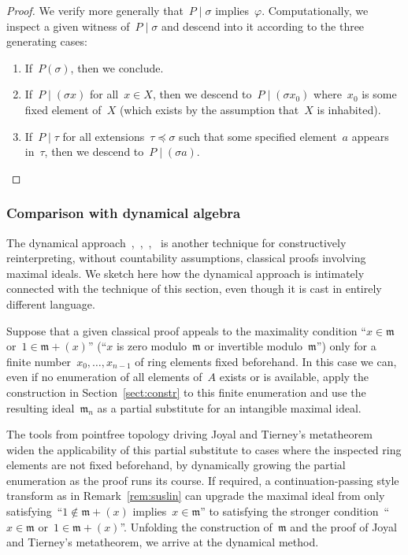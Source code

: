 \documentclass[com,11pt,crcready]{iosart2x}
\theoremstyle{definition}
\theoremstyle{plain}
\theoremstyle{remark}
\newcommand{\mmm}{\mathfrak{m}}
\renewcommand{\_}{\mathpunct{.}\,}
\begin{document}
\begin{proof}We verify more generally that~$P \mid \sigma$ implies~$\varphi$.
Computationally, we inspect a given witness of~$P \mid \sigma$ and descend into
it according to the three generating cases:
\begin{enumerate}
\item If~$P(\sigma)$, then we conclude.
\item
If~$P \mid (\sigma x)$ for all~$x \in X$, then we descend to~$P \mid
(\sigma x_0)$ where~$x_0$ is some fixed element of~$X$ (which exists by
the assumption that~$X$ is inhabited).
\item If~$P \mid \tau$ for all
extensions~$\tau \preceq \sigma$ such that some specified element~$a$ appears
in~$\tau$, then we descend to~$P \mid (\sigma a)$.
\end{enumerate}
\end{proof}


\subsubsection{Comparison with dynamical algebra}

The dynamical approach~\cite[Section~XV.6]{lombardi-quitte:constructive-algebra},~\cite{coquand-lombardi-roy:dynamicalmethod},~\cite{yengui:constructive},~\cite{duval:about}
is another technique for constructively reinterpreting,
without countability assumptions, classical proofs involving maximal ideals.
We sketch here how the dynamical approach is intimately connected with the
technique of this section, even though it is cast in entirely different
language.

Suppose that a given classical proof appeals to the maximality condition ``$x \in \mmm$
or~$1 \in \mmm + (x)$'' (``$x$ is zero modulo~$\mmm$ or invertible
modulo~$\mmm$'') only for a finite number~$x_0,\ldots,x_{n-1}$ of ring elements
fixed beforehand. In this case we can, even if no enumeration of all elements
of~$A$ exists or is available, apply the construction in Section~\ref{sect:constr} to
this finite enumeration and use the resulting ideal~$\mmm_n$ as a partial
substitute for an intangible maximal ideal.

The tools from pointfree topology
driving Joyal and Tierney's metatheorem widen the applicability of this partial
substitute to cases where the inspected ring elements are
not fixed beforehand, by dynamically growing the partial enumeration as the
proof runs its course. If required, a continuation-passing style transform as
in Remark~\ref{rem:suslin} can upgrade the maximal ideal from only
satisfying~``$1 \not\in \mmm + (x)$ implies~$x \in
\mmm$'' to satisfying the stronger condition~``$x \in \mmm$ or~$1 \in \mmm
+ (x)$''.
%
Unfolding the construction of~$\mmm$ and the proof of Joyal
and Tierney's metatheorem, we arrive at the dynamical method.
\end{document}
